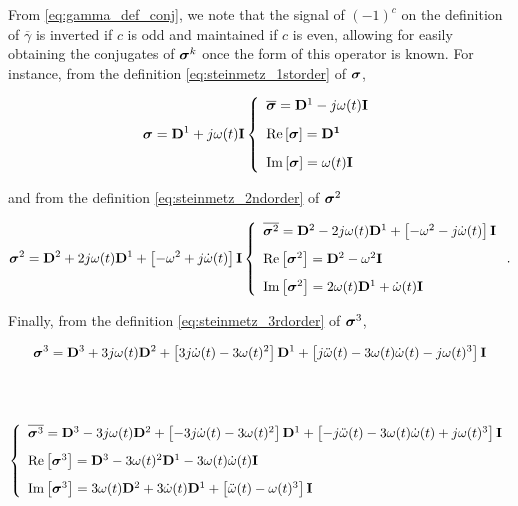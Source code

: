 \begin{example} %

	From \eqref{eq:gamma_def_conj}, we note that the signal of $\left(-1\right)^c$ on the definition of $\overline{\gamma}$ is inverted if $c$ is odd and maintained if $c$ is even, allowing for easily obtaining the conjugates of $\boldsymbol{\sigma}^{k}$ once the form of this operator is known. For instance, from the definition \eqref{eq:steinmetz_1storder} of $\boldsymbol{\sigma}$,

\begin{equation}
	\boldsymbol{\sigma} = \mathbf{D}^1 + j\omega(t)\mathbf{I} \left\{\begin{array}{l} \overline{\boldsymbol{\sigma}} = \mathbf{D}^1 - j\omega(t)\mathbf{I} \\[3mm] \operatorname{Re}\left[\boldsymbol{\sigma}\right] = \mathbf{D^1} \\[3mm] \operatorname{Im}\left[\boldsymbol{\sigma}\right] = \omega(t)\mathbf{I} \end{array}\right. 
\end{equation}

	\noindent and from the definition \eqref{eq:steinmetz_2ndorder} of $\boldsymbol{\sigma}^{2}$

\begin{equation}
	\boldsymbol{\sigma}^{2} = \mathbf{D}^2 + 2j\omega(t)\mathbf{D}^1 + \left[-\omega^2 + j\dot{\omega}(t)\right]\mathbf{I} \left\{\begin{array}{l} \overline{\boldsymbol{\sigma}^{2}} = \mathbf{D}^2 - 2j\omega(t)\mathbf{D}^1 + \left[-\omega^2 - j\dot{\omega}(t)\right]\mathbf{I} \\[3mm] \operatorname{Re}\left[\boldsymbol{\sigma}^{2}\right] = \mathbf{D}^2  - \omega^2\mathbf{I} \\[3mm] \operatorname{Im}\left[\boldsymbol{\sigma}^{2}\right] = 2\omega(t)\mathbf{D}^1 + \dot{\omega}(t) \mathbf{I}\end{array}\right. .
\end{equation}

	Finally, from the definition \eqref{eq:steinmetz_3rdorder} of $\boldsymbol{\sigma}^{3}$,

\begin{gather}
	\ndpo{3} = \mathbf{D}^3 + 3j \omega(t) \mathbf{D}^2 + \left[ 3j \dot{\omega}(t) - 3 \omega(t)^2 \right] \mathbf{D}^1 + \left[ j \ddot{\omega}(t) - 3 \omega(t) \dot{\omega}(t) - j \omega(t)^3 \right]\mathbf{I} \\[15mm]
%
	\left\{\begin{array}{l}
		\overline{\ndpo{3}} = \mathbf{D}^3 - 3j \omega(t) \mathbf{D}^2 + \left[ -3j \dot{\omega}(t) - 3 \omega(t)^2 \right] \mathbf{D}^1 + \left[ -j \ddot{\omega}(t) - 3 \omega(t) \dot{\omega}(t) + j \omega(t)^3 \right]\mathbf{I} \\[3mm]
%
		\Re\left[\ndpo{3}\right] = \mathbf{D}^3 - 3 \omega(t)^2 \mathbf{D}^1 - 3 \omega(t) \dot{\omega}(t) \mathbf{I} \\[3mm]
%
		\Im\left[\ndpo{3}\right] = 3\omega(t) \mathbf{D}^2 + 3 \dot{\omega}(t) \mathbf{D}^1 + \left[ \ddot{\omega}(t) - \omega(t)^3 \right]\mathbf{I}
	\end{array}\right.
\end{gather}
\examplebar
\end{example} %

